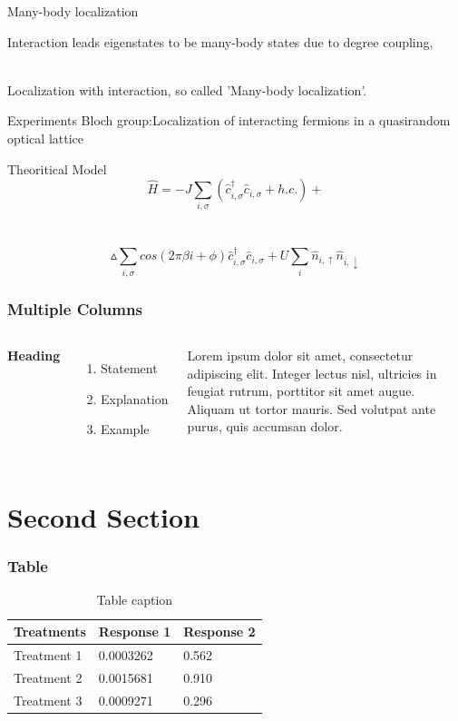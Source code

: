 \documentclass{beamer}
\begin{document}
\begin{frame}{Many-body localization}

Interaction leads eigenstates to be many-body states due to degree coupling,\\~

Localization with interaction, so called 'Many-body localization'.

\end{frame}

\begin{frame}{Experiments}
Bloch group:Localization of interacting fermions in a quasirandom optical lattice
\begin{block}{Theoritical Model}
$$\hat{H}=-J\sum_{i,\sigma}(\hat{c}_{i,\sigma}^{\dagger}\hat{c}_{i,\sigma}+h.c.)+$$\\~
$$\vartriangle \sum_{i,\sigma}cos(2\pi\beta i+\phi)\hat{c}_{i,\sigma}^{\dagger}\hat{c}_{i,\sigma}+U\sum_{i}\hat{n}_{i,\uparrow}\hat{n}_{i,\downarrow}$$
\end{block}
\end{frame}

\begin{frame}
\frametitle{Multiple Columns}
\begin{columns}[c] %

\textbf{Heading}
\begin{enumerate}
\item Statement
\item Explanation
\item Example
\end{enumerate}

Lorem ipsum dolor sit amet, consectetur adipiscing elit. Integer lectus nisl, ultricies in feugiat rutrum, porttitor sit amet augue. Aliquam ut tortor mauris. Sed volutpat ante purus, quis accumsan dolor.

\end{columns}
\end{frame}

\section{Second Section}

\begin{frame}
\frametitle{Table}
\begin{table}
\begin{tabular}{l l l}
\toprule
\textbf{Treatments} & \textbf{Response 1} & \textbf{Response 2}\\
\midrule
Treatment 1 & 0.0003262 & 0.562 \\
Treatment 2 & 0.0015681 & 0.910 \\
Treatment 3 & 0.0009271 & 0.296 \\
\bottomrule
\end{tabular}
\caption{Table caption}
\end{table}
\end{frame}
\end{document}

